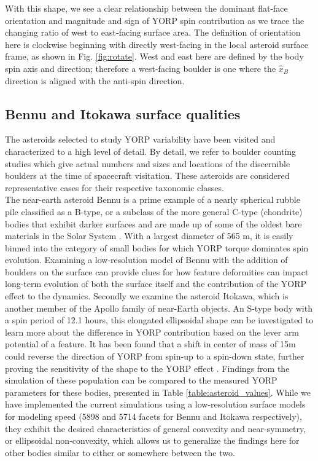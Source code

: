 With this shape, we see a clear relationship between the dominant flat-face orientation and magnitude and sign of YORP spin contribution as we trace the changing ratio of west to east-facing surface area. The definition of orientation here is clockwise beginning with directly west-facing in the local asteroid surface frame, as shown in Fig. \ref{fig:rotate}. West and east here are defined by the body spin axis and direction; therefore a west-facing boulder is one where the $\hat{x}_B$ direction is aligned with the anti-spin direction. 

\subsection{Bennu and Itokawa surface qualities}

The asteroids selected to study YORP variability have been visited and characterized to a high level of detail. By detail, we refer to boulder counting studies which give actual numbers and sizes and locations of the discernible boulders at the time of spacecraft visitation. These asteroids are considered representative cases for their respective taxonomic classes. 
\\ \indent The near-earth asteroid Bennu is a prime example of a nearly spherical rubble pile classified as a B-type, or a subclass of the more general C-type (chondrite) bodies that exhibit darker surfaces and are made up of some of the oldest bare materials in the Solar System \cite{Lauretta2019}. With a largest diameter of 565 m, it is easily binned into the category of small bodies for which YORP torque dominates spin evolution. Examining a low-resolution model of Bennu with the addition of boulders on the surface can provide clues for how feature deformities can impact long-term evolution of both the surface itself and the contribution of the YORP effect to the dynamics. 
Secondly we examine the asteroid Itokawa, which is another member of the Apollo family of near-Earth objects. An S-type body with a spin period of 12.1 hours, this elongated ellipsoidal shape can be investigated to learn more about the difference in YORP contribution based on the lever arm potential of a feature. It has been found that a shift in center of mass of 15m could reverse the direction of YORP from spin-up to a spin-down state, further proving the sensitivity of the shape to the YORP effect \cite{Scheeres2008}.
Findings from the simulation of these population can be compared to the measured YORP parameters for these bodies, presented in Table \ref{table:asteroid_values}. While we have implemented the current simulations using a low-resolution surface models for modeling speed (5898 and 5714 facets for Bennu and Itokawa respectively), they exhibit the desired characteristics of general convexity and near-symmetry, or ellipsoidal non-convexity, which allows us to generalize the findings here for other bodies similar to either or somewhere between the two.

